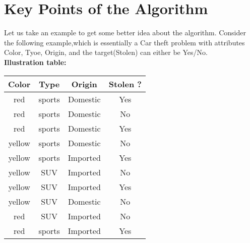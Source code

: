 \documentclass[a4paper, 11pt]{article}
\begin{document}
\section{Key Points of the Algorithm}
Let us take an example to get some better idea about the algorithm. Consider the following example,which is essentially a Car theft problem with attributes Color, Tyoe, Origin, and the target(Stolen) can either be Yes/No.\\
\vspace{3mm}
\textbf{Illustration table:}  \\
\begin{center}
    \begin{tabular}{|c| c| c| c|} 
     \hline
     Color & Type & Origin & Stolen ? \\ [0.5ex] 
     \hline\hline
     red & sports & Domestic & Yes \\ 
     \hline
     red & sports & Domestic & No \\
     \hline
    red & sports & Domestic & Yes\\
     \hline
    yellow & sports & Domestic & No \\
     \hline
     yellow & sports & Imported & Yes \\ 
     \hline
     yellow & SUV & Imported & No \\
     \hline
     yellow & SUV & Imported & Yes \\
     \hline
     yellow & SUV & Domestic & No\\
     \hline
     red & SUV & Imported & No\\
     \hline
     red & sports & Imported & Yes \\[1ex] 
     \hline
    \end{tabular}
    \end{center}
\end{document}
